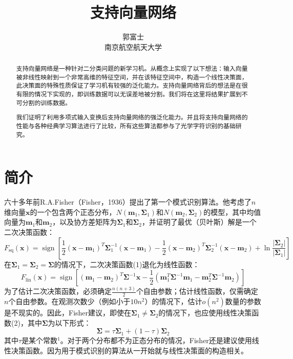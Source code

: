 \documentclass[lang=cn,11pt,a4paper]{elegantpaper}
\title{支持向量网络}
\author{郭富士 \\ 南京航空航天大学}
\institute{}
\date{\zhtoday}
\begin{document}
	\maketitle

	\begin{abstract}
	\qquad 支持向量网络是一种针对二分类问题的新学习机。从概念上实现了以下想法：输入向量被非线性映射到一个非常高维的特征空间，并在该特征空间中，构造一个线性决策面，此决策面的特殊性质保证了学习机有较强的泛化能力。支持向量网络背后的想法是在很有限的情况下实现的，即训练数据可以无误差地被分割。我们将在这里将结果扩展到不可分割的训练数据。

	我们证明了利用多项式输入变换后支持向量网络的强泛化能力。并且将支持向量网络的性能与各种经典学习算法进行了比较，所有这些算法都参与了光学字符识别的基础研究。
	\end{abstract}

	\section{简介}
	六十多年前R.A.Fisher（Fisher，1936）提出了第一个模式识别算法。他考虑了$n$维向量$\mathbf{x}$的一个包含两个正态分布，$N(\mathbf{m}_1,\mathbf{\Sigma}_1)$和$N(\mathbf{m}_2,\mathbf{\Sigma}_2)$的模型，其中均值向量为$\mathbf{m}_1$和$\mathbf{m}_2$，以及协方差矩阵为$\mathbf{\Sigma}_1$和$\mathbf{\Sigma}_2$，并证明了最优（贝叶斯）解是一个二次决策函数：
	\begin{equation}
		F_{\mathrm{sq}}(\mathbf{x})=\operatorname{sign}\left[\frac{1}{2}\left(\mathbf{x}-\mathbf{m}_{1}\right)^{T} \mathbf{\Sigma}_{1}^{-1}\left(\mathbf{x}-\mathbf{m}_{1}\right)-\frac{1}{2}\left(\mathbf{x}-\mathbf{m}_{2}\right)^{T} \mathbf{\Sigma}_{2}^{-1}\left(\mathbf{x}-\mathbf{m}_{2}\right)+\ln \frac{\left|\mathbf{\Sigma}_{2}\right|}{\left|\mathbf{\Sigma}_{1}\right|}\right]\tag{1}
	\end{equation}
	在$\mathbf{\Sigma}_{1}=\mathbf{\Sigma}_{2}=\mathbf{\Sigma}$的情况下，二次决策函数(1)退化为线性函数：
	\begin{equation}
		F_{\mathrm{lin}}(\mathbf{x})=\operatorname{sign}\left[\left(\mathbf{m}_{1}-\mathbf{m}_{2}\right)^{T} \mathbf{\Sigma}^{-1} \mathbf{x}-\frac{1}{2}\left(\mathbf{m}_{1}^{T} \mathbf{\Sigma}^{-1} \mathbf{m}_{1}-\mathbf{m}_{2}^{T} \mathbf{\Sigma}^{-1} \mathbf{m}_{2}\right)\right]\tag{2}
	\end{equation}
	为了估计二次决策函数，必须确定$\frac{n(n+3)}{2}$个自由参数；估计线性函数，仅需确定$n$个自由参数。在观测次数少（例如小于$10n^2$）的情况下，估计$o(n^2)$数量的参数是不现实的。因此，Fisher建议，即使在$\mathbf{\Sigma}_1\neq\mathbf{\Sigma}_2$的情况下，也应使用线性决策函数(2)，其中$\mathbf{\Sigma}$为以下形式：
	\begin{equation}
		\mathbf{\Sigma}=\tau\mathbf{\Sigma}_1+(1-\tau)\mathbf{\Sigma}_2\tag{3}
	\end{equation}
	其中$\tau$是某个常数$^1$。对于两个分布都不为正态分布的情况，Fisher还是建议使用线性决策函数。因为用于模式识别的算法从一开始就与线性决策面的构造相关。
\end{document}
